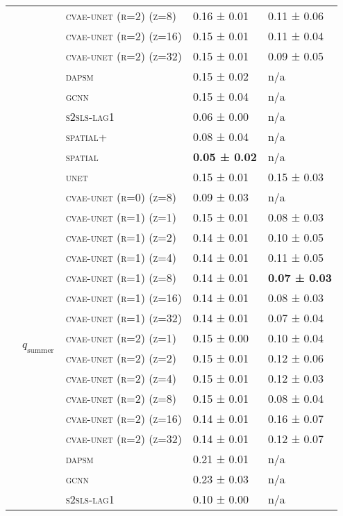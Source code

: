 \documentclass{article}
\begin{document}
\begin{table}[!tbp]
\begin{tabular}{lllll}
 &  & \textsc{cvae-unet (r=2) (z=8)} & 0.16 ± { 0.01} & 0.11 ± { 0.06} \\
 &  & \textsc{cvae-unet (r=2) (z=16)} & 0.15 ± { 0.01} & 0.11 ± { 0.04} \\
 &  & \textsc{cvae-unet (r=2) (z=32)} & 0.15 ± { 0.01} & 0.09 ± { 0.05} \\
 &  & \textsc{dapsm} & 0.15 ± { 0.02} & n/a \\
 &  & \textsc{gcnn} & 0.15 ± { 0.04} & n/a \\
 &  & \textsc{s2sls-lag1} & 0.06 ± { 0.00} & n/a \\
 &  & \textsc{spatial+} & 0.08 ± { 0.04} & n/a \\
 &  & \textsc{spatial} & \bf 0.05 ± { 0.02} & n/a \\
 &  & \textsc{unet} & 0.15 ± { 0.01} & 0.15 ± { 0.03} \\
\cline{2-5}
 & \multirow[t]{19}{*}{$q_{\text{summer}}$} & \textsc{cvae-unet (r=0) (z=8)} & 0.09 ± { 0.03} & n/a \\
 &  & \textsc{cvae-unet (r=1) (z=1)} & 0.15 ± { 0.01} & 0.08 ± { 0.03} \\
 &  & \textsc{cvae-unet (r=1) (z=2)} & 0.14 ± { 0.01} & 0.10 ± { 0.05} \\
 &  & \textsc{cvae-unet (r=1) (z=4)} & 0.14 ± { 0.01} & 0.11 ± { 0.05} \\
 &  & \textsc{cvae-unet (r=1) (z=8)} & 0.14 ± { 0.01} & \bf 0.07 ± { 0.03} \\
 &  & \textsc{cvae-unet (r=1) (z=16)} & 0.14 ± { 0.01} & 0.08 ± { 0.03} \\
 &  & \textsc{cvae-unet (r=1) (z=32)} & 0.14 ± { 0.01} & 0.07 ± { 0.04} \\
 &  & \textsc{cvae-unet (r=2) (z=1)} & 0.15 ± { 0.00} & 0.10 ± { 0.04} \\
 &  & \textsc{cvae-unet (r=2) (z=2)} & 0.15 ± { 0.01} & 0.12 ± { 0.06} \\
 &  & \textsc{cvae-unet (r=2) (z=4)} & 0.15 ± { 0.01} & 0.12 ± { 0.03} \\
 &  & \textsc{cvae-unet (r=2) (z=8)} & 0.15 ± { 0.01} & 0.08 ± { 0.04} \\
 &  & \textsc{cvae-unet (r=2) (z=16)} & 0.14 ± { 0.01} & 0.16 ± { 0.07} \\
 &  & \textsc{cvae-unet (r=2) (z=32)} & 0.14 ± { 0.01} & 0.12 ± { 0.07} \\
 &  & \textsc{dapsm} & 0.21 ± { 0.01} & n/a \\
 &  & \textsc{gcnn} & 0.23 ± { 0.03} & n/a \\
 &  & \textsc{s2sls-lag1} & 0.10 ± { 0.00} & n/a \\

\end{tabular}
\end{table}
\end{document}
